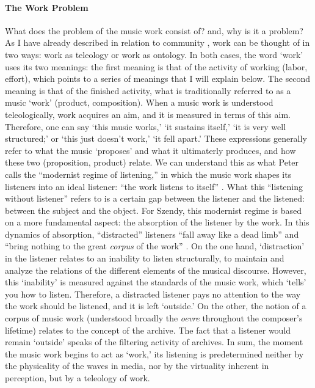 
\paragraph{The Work Problem}
What does the problem of the music work consist of? and, why is it a problem? As I have already described in relation to community , work can be thought of in two ways: work as teleology or work as ontology. In both cases, the word `work' uses its two meanings: the first meaning is that of the activity of working (labor, effort), which points to a series of meanings that I will explain below. The second meaning is that of the finished activity, what is traditionally referred to as a music `work' (product, composition). When a music work is understood teleologically, work acquires an aim, and it is measured in terms of this aim. Therefore, one can say `this music works,' `it sustains itself,' `it is very well structured;' or `this just doesn't work,' `it fell apart.' These expressions generally refer to what the music `proposes' and what it ultimaterly produces, and how these two (proposition, product) relate. We can understand this as what Peter \textcite{Sze08:Lis} calls the ``modernist regime of listening,'' in which the music work shapes its listeners into an ideal listener: ``the work listens to itself'' \parencite[127]{Sze08:Lis}. What this ``listening without listener'' refers to is a certain gap between the listener and the listened: between the subject and the object. For Szendy, this modernist regime is based on a more fundamental aspect: the absorption of the listener by the work. In this dynamics of absorption, ``distracted'' listeners ``fall away like a dead limb'' and ``bring nothing to the great \textit{corpus} of the work'' \parencite[127]{Sze08:Lis}. On the one hand, `distraction' in the listener relates to an inability to listen structurally, to maintain and analyze the relations of the different elements of the musical discourse. However, this `inability' is measured against the standards of the music work, which `tells' you how to listen. Therefore, a distracted listener pays no attention to the way the work should be listened, and it is left `outside.' On the other, the notion of a corpus of music work (understood broadly the \textit{oevre} throughout the composer's lifetime) relates to the concept of the archive. The fact that a listener would remain `outside' speaks of the filtering activity of archives. 
In sum, the moment the music work begins to act as `work,' its listening is predetermined neither by the physicality of the waves in media, nor by the virtuality inherent in perception, but by a teleology of work. 

